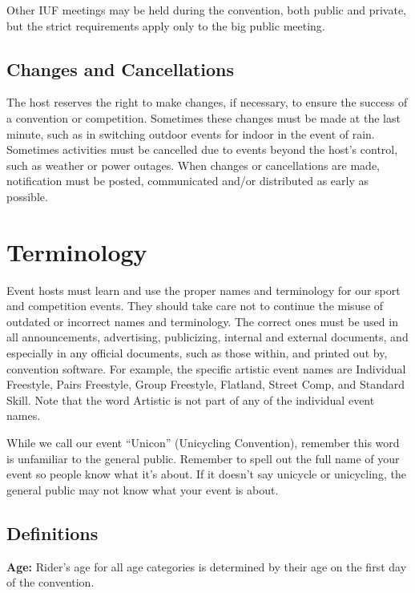 Other IUF meetings may be held during the convention, both public and private, but the strict requirements apply only to the big public meeting.

\section{Changes and Cancellations}

The host reserves the right to make changes, if necessary, to ensure the success of a convention or competition. 
Sometimes these changes must be made at the last minute, such as in switching outdoor events for indoor in the event of rain. 
Sometimes activities must be cancelled due to events beyond the host's control, such as weather or power outages. 
When changes or cancellations are made, notification must be posted, communicated and/or distributed as early as possible.

\chapter{Terminology}

Event hosts must learn and use the proper names and terminology for our sport and competition events. 
They should take care not to continue the misuse of outdated or incorrect names and terminology. 
The correct ones must be used in all announcements, advertising, publicizing, internal and external documents, and especially in any official documents, such as those within, and printed out by, convention software. 
For example, the specific artistic event names are Individual Freestyle, Pairs Freestyle, Group Freestyle, Flatland, Street Comp, and Standard Skill. 
Note that the word Artistic is not part of any of the individual event names.

While we call our event ``Unicon'' (Unicycling Convention), remember this word is unfamiliar to the general public. 
Remember to spell out the full name of your event so people know what it's about. 
If it doesn't say unicycle or unicycling, the general public may not know what your event is about.

\section{Definitions \label{chap:general_definitions}}

\textbf{Age:} Rider's age for all age categories is determined by their age on the first day of the convention.

